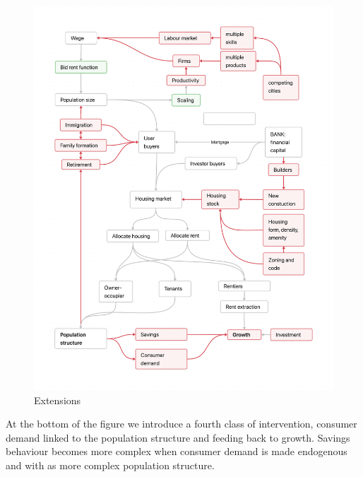 {\newpage\thispagestyle{empty}
\vspace{-1.5cm}
\begin{figure}
\vspace{-4.5cm}
\begin{adjustwidth}{-0.24\textwidth}{-0.2\textwidth}
\centering
\includegraphics[scale=.22]{fig/extensions-logic.png}
\end{adjustwidth}
\caption{Extensions}
\label{fig-extensions-logic}
\end{figure}}


At the bottom of the figure we introduce a fourth class of intervention, consumer demand linked to the population structure and feeding back to growth. Savings behaviour becomes more  complex when consumer demand is made endogenous and with as more complex population structure.

